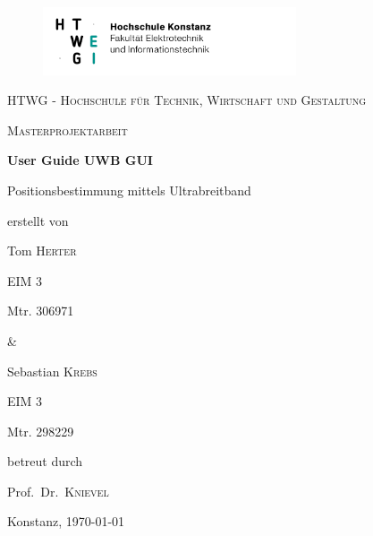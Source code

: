 \begin{titlepage}
    \begin{figure}[!tbp]
        \centering
        \begin{minipage}[b]{0.55\linewidth}
            \includegraphics[height=2cm]{pictures/HTWG_logo.png}
        \end{minipage}%
        \hfill%
        \begin{minipage}[b]{0.4\linewidth}
            \hfill%
        \end{minipage}%
    \end{figure}
    \centering
    {\scshape\Large HTWG - Hochschule für Technik, Wirtschaft und Gestaltung \par}
    \vspace{1cm}
    {\scshape\LARGE Masterprojektarbeit\par}
    \vspace{1.5cm}
    {\huge\bfseries User Guide UWB GUI\par}
    \vspace{2cm}
    {\Large Positionsbestimmung mittels Ultrabreitband \par}
    \vfill
    erstellt von\par
    Tom \textsc{Herter}\par
    EIM 3\par
    Mtr. 306971\par
    \&\par
    Sebastian \textsc{Krebs}\par
    EIM 3\par
    Mtr. 298229\par
    \vfill
    betreut durch\par
    Prof.\ Dr.~\textsc{Knievel}
    \vfill
	{\large Konstanz, \today\par}
\end{titlepage}

